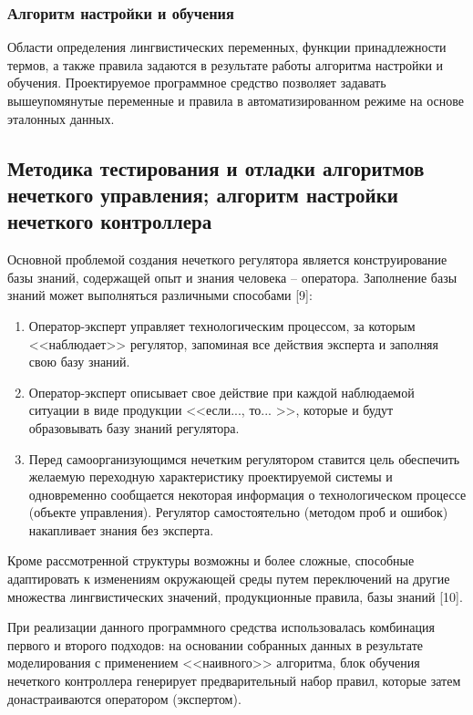 \subsubsection{ Алгоритм настройки и обучения }

Области определения лингвистических переменных, функции принадлежности термов, а также правила задаются в результате работы алгоритма настройки и обучения. Проектируемое программное средство позволяет задавать вышеупомянутые переменные и правила в автоматизированном режиме на основе эталонных данных.

\subsection{Методика тестирования и отладки алгоритмов нечеткого управления; алгоритм настройки нечеткого контроллера}

Основной проблемой создания нечеткого регулятора является конструирование базы знаний, содержащей опыт и знания человека – оператора. Заполнение базы знаний может выполняться различными способами [9]:

\begin{enumerate}[label=\arabic*)]
  \item Оператор-эксперт управляет технологическим процессом, за которым <<наблюдает>> регулятор, запоминая все действия эксперта и заполняя свою базу знаний.
  \item Оператор-эксперт описывает свое действие при каждой наблюдаемой ситуации в виде продукции <<если..., то... >>, которые и будут образовывать базу знаний регулятора.
  \item Перед самоорганизующимся нечетким регулятором ставится цель обеспечить желаемую переходную характеристику проектируемой системы и одновременно сообщается некоторая информация о технологическом процессе (объекте управления). Регулятор самостоятельно (методом проб и ошибок) накапливает знания без эксперта.
\end{enumerate}

Кроме рассмотренной структуры возможны и более сложные, способные адаптировать к изменениям окружающей среды путем переключений на другие множества лингвистических значений, продукционные правила, базы знаний [10].

При реализации данного программного средства использовалась комбинация первого и второго подходов: на основании собранных данных в результате моделирования с применением <<наивного>> алгоритма, блок обучения нечеткого контроллера генерирует предварительный набор правил, которые затем донастраиваются оператором (экспертом).

